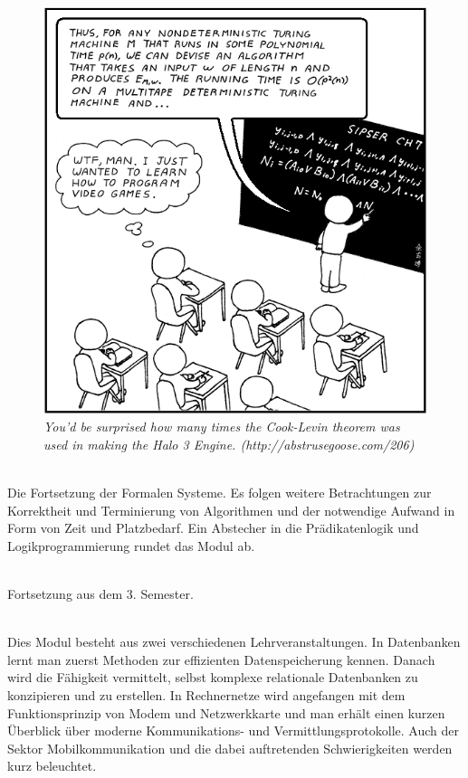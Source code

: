 \begin{figure}[h!]
\centering
\includegraphics[scale=.5]{img/xkcd/computer_science_major.png}
\caption*{{\small \textit{You'd be surprised how many times the Cook-Levin theorem was used in making the Halo 3 Engine. (http://abstrusegoose.com/206)}}}
\end{figure}


\textbf{} \\
Die Fortsetzung der Formalen Systeme.
Es folgen weitere Betrachtungen zur Korrektheit und Terminierung von Algorithmen und der notwendige Aufwand in Form von Zeit und Platzbedarf.
Ein Abstecher in die Prädikatenlogik und Logikprogrammierung rundet das Modul ab.

\textbf{} \\
Fortsetzung aus dem 3. Semester.

\textbf{} \\
Dies Modul besteht aus zwei verschiedenen Lehrveranstaltungen.
In Datenbanken lernt man zuerst Methoden zur effizienten Datenspeicherung kennen.
Danach wird die Fähigkeit vermittelt, selbst komplexe relationale Datenbanken zu konzipieren und zu erstellen.
In Rechnernetze wird angefangen mit dem Funktionsprinzip von Modem und Netzwerkkarte und man erhält einen kurzen Überblick über moderne Kommunikations- und Vermittlungsprotokolle.
Auch der Sektor Mobilkommunikation und die dabei auftretenden Schwierigkeiten werden kurz beleuchtet.


